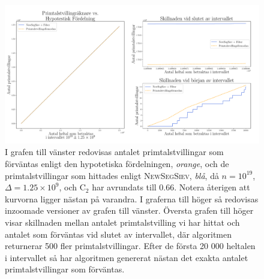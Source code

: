 \begin{figure}[h]
    \centering
    \includegraphics[width = \textwidth]{coen/Images/TwinPrimesNoKapp.pdf}
    \caption{I grafen till vänster redovisas antalet primtalstvillingar som förväntas enligt den hypotetiska fördelningen, \textit{orange}, och de primtalstvillingar som hittades enligt \textsc{NewSegSiev}, \textit{blå}, då \(n = 10^{19}\), \(\Delta = 1.25\times10^9\), och \(\text{C}_2\) har avrundats till 0.66. Notera återigen att kurvorna ligger nästan på varandra. I graferna till höger så redovisas inzoomade versioner av grafen till vänster. 
    Översta grafen till höger visar skillnaden mellan antalet primtalstvilling vi har hittat och antalet som förväntas vid slutet av intervallet, där algoritmen returnerar 500 fler primtalstvillingar. Efter de första 20 000 heltalen i intervallet så har algoritmen genererat nästan det exakta antalet primtalstvillingar som förväntas.}
    \label{fig:res.twins}
\end{figure}

